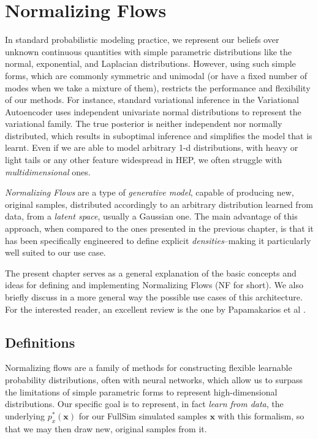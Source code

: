 \chapter{Normalizing Flows}\label{ch:mathtest} %

In standard probabilistic modeling practice, we represent our beliefs over unknown continuous quantities with simple parametric distributions like the normal, exponential, and Laplacian distributions. However, using such simple forms, which are commonly symmetric and unimodal (or have a fixed number of modes when we take a mixture of them), restricts the performance and flexibility of our methods. For instance, standard variational inference in the Variational Autoencoder uses independent univariate normal distributions to represent the variational family. The true posterior is neither independent nor normally distributed, which results in suboptimal inference and simplifies the model that is learnt. Even if we are able to model arbitrary 1-d distributions, with heavy or light tails or any other feature widespread in HEP, we often struggle with \emph{multidimensional} ones.

\emph{Normalizing Flows} are a type of \emph{generative model}, capable of producing new, original samples, distributed accordingly to an arbitrary distribution learned from data, from a \emph{latent space}, usually a Gaussian one. The main advantage of this approach, when compared to the ones presented in the previous chapter, is that it has been specifically engineered to define explicit \emph{densities}--making it particularly well suited to our use case.

The present chapter serves as a general explanation of the basic concepts and ideas for defining and implementing Normalizing Flows (NF for short). We also briefly discuss in a more general way the possible use cases of this architecture. For the interested reader, an excellent review is the one by Papamakarios et al \cite{papanf}.

\section{Definitions}

Normalizing flows are a family of methods for constructing flexible learnable probability distributions, often with neural networks, which allow us to surpass the limitations of simple parametric forms to represent high-dimensional distributions. Our specific goal is to represent, in fact \emph{learn from data}, the underlying $p^*_x(\mathbf{x})$ for our FullSim simulated samples $\mathbf{x}$ with this formalism, so that we may then draw new, original samples from it.

